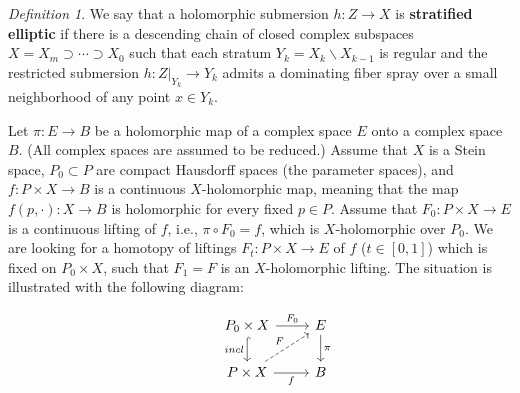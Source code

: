 \documentclass[10pt]{amsart}
\theoremstyle{remark}
\newtheorem{defi}[theo]{Definition}
\begin{document}
\begin{defi}
We say that a holomorphic submersion $h: Z \to X$ is \textbf{stratified elliptic} if there is a descending
chain of closed complex subspaces $X = X_m \supset \cdots \supset X_0$ such that each stratum $Y_k = X_k \backslash X_{k-1}$
is regular and the restricted submersion $h: Z|_{Y_k} \to Y_k$ admits a dominating fiber spray over a small neighborhood of any point $x \in Y_k$.
\end{defi}

Let $\pi: E \to B$ be a holomorphic map of a complex space $E$ onto a complex space $B$. (All complex spaces are assumed to be reduced.) Assume that $X$ is a Stein space, $P_0 \subset P$ are compact Hausdorff spaces (the parameter spaces), and $f : P \times X \to B$ is a continuous $X$-holomorphic map, meaning that the map $f(p, \cdot): X \to B$ is holomorphic for every fixed $p \in P$. Assume that $F_0: P \times X \to E$ is a continuous lifting of $f$, i.e., $\pi \circ F_0 = f$, which is $X$-holomorphic over $P_0$. We are looking for a homotopy of liftings $F_t : P \times X \to E$ of $f$ ($t \in [0,1]$) which is fixed on $P_0 \times X$, such that $F_1 = F$ is an $X$-holomorphic lifting. The situation is illustrated with the following diagram:

\[
\begin{tikzcd}
& P_0 \times X \arrow[r, "F_0"] \arrow[d, hook, "incl"'] & E \arrow[d, "\pi"]   \\
& P \times X \arrow[ur, dashed, "F"] \arrow[r, "f"'] & B
\end{tikzcd}
\]
\end{document}
